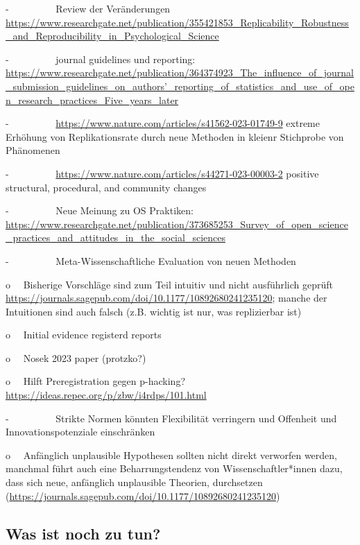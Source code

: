 \documentclass[
  letterpaper,
  DIV=11,
  numbers=noendperiod]{scrreprt}
\begin{document}
-~~~~~~~~~ Review der Veränderungen
\url{https://www.researchgate.net/publication/355421853_Replicability_Robustness_and_Reproducibility_in_Psychological_Science}

-~~~~~~~~~ journal guidelines und reporting:
\href{https://www.researchgate.net/publication/364374923_The_influence_of_journal_submission_guidelines_on_authors'_reporting_of_statistics_and_use_of_open_research_practices_Five_years_later}{https://www.researchgate.net/publication/364374923\_The\_influence\_of\_journal\_submission\_guidelines\_on\_authors'\_reporting\_of\_statistics\_and\_use\_of\_open\_research\_practices\_Five\_years\_later}

-~~~~~~~~~ \url{https://www.nature.com/articles/s41562-023-01749-9}
extreme Erhöhung von Replikationsrate durch neue Methoden in kleienr
Stichprobe von Phänomenen

-~~~~~~~~~ \url{https://www.nature.com/articles/s44271-023-00003-2}
positive structural, procedural, and community changes

-~~~~~~~~~ Neue Meinung zu OS Praktiken:
\url{https://www.researchgate.net/publication/373685253_Survey_of_open_science_practices_and_attitudes_in_the_social_sciences}

-~~~~~~~~~ Meta-Wissenschaftliche Evaluation von neuen Methoden

o~~ Bisherige Vorschläge sind zum Teil intuitiv und nicht ausführlich
geprüft
\url{https://journals.sagepub.com/doi/10.1177/10892680241235120}; manche
der Intuitionen sind auch falsch (z.B. wichtig ist nur, was replizierbar
ist)

o~~ Initial evidence registerd reports

o~~ Nosek 2023 paper (protzko?)

o~~ Hilft Preregistration gegen p-hacking?
\url{https://ideas.repec.org/p/zbw/i4rdps/101.html}

-~~~~~~~~~ Strikte Normen könnten Flexibilität verringern und Offenheit
und Innovationspotenziale einschränken

o~~ Anfänglich unplausible Hypothesen sollten nicht direkt verworfen
werden, manchmal führt auch eine Beharrungstendenz von
Wissenschaftler*innen dazu, dass sich neue, anfänglich unplausible
Theorien, durchsetzen
(\url{https://journals.sagepub.com/doi/10.1177/10892680241235120})

\subsection*{Was ist noch zu tun?}\label{was-ist-noch-zu-tun}
\end{document}
